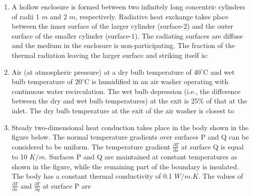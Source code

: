 \documentclass[journal]{IEEEtran}
\numberwithin{equation}{enumi}
\numberwithin{figure}{enumi}
\begin{document}
\begin{enumerate}
\begin{enumerate}
\end{enumerate}
\item A hollow enclosure is formed between two infinitely long concentric cylinders of radii 1 $m $ and 2 $m$, respectively. Radiative heat exchange takes place between the inner surface of the larger cylinder (surface-2) and the outer surface of the smaller cylinder (surface-1). The radiating surfaces are diffuse and the medium in the enclosure is non-participating. The fraction of the thermal radiation leaving the larger surface and striking itself is:
\hfill{}

\begin{enumerate}
\end{enumerate} 
\item Air (at atmospheric pressure) at a dry bulb temperature of $40^\circ \text{C}$ and wet bulb temperature of $20^\circ \text{C}$ is humidified in an air washer operating with continuous water recirculation. The wet bulb depression (i.e., the difference between the dry and wet bulb temperatures) at the exit is 25\% of that at the inlet. The dry bulb temperature at the exit of the air washer is closest to
\hfill{}
\begin{enumerate}
\end{enumerate}
\item Steady two-dimensional heat conduction takes place in the body shown in the figure below. The normal temperature gradients over surfaces P and Q can be considered to be uniform. The temperature gradient $\frac{\partial T}{\partial x}$ at surface Q is equal to 10 $K/m$. Surfaces P and Q are maintained at constant temperatures as shown in the figure, while the remaining part of the boundary is insulated. The body has a constant thermal conductivity of 0.1 $W/m.K$. The values of $\frac{\partial T}{\partial x}$ and $\frac{\partial T}{\partial y}$ at surface P are
\hfill{}





\end{enumerate}
\end{document}
